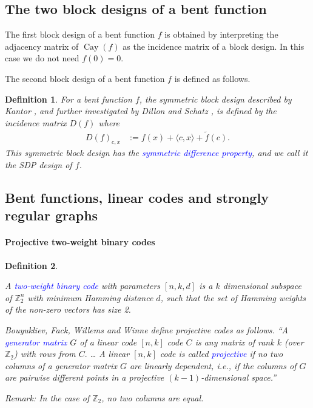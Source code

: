 \documentclass[12pt,a4paper]{article}
\newcommand{\mb}[1]{\mathbb{#1}}
\newcommand{\Z}{\mb{Z}}
\newcommand{\Emph}[1]{\emph{\textcolor{blue}{#1}}}
\newcommand{\Cay}[1]{\operatorname{Cay}\left(#1\right)}
\newcommand{\dual}[1]{\widetilde{#1}}
\newtheorem{Definition}{Definition}
\begin{document}
\subsection{The two block designs of a bent function}

The first block design of a bent function $f$ is obtained by interpreting
the adjacency matrix of $\Cay{f}$ as the incidence matrix of a block design.
In this case we do not need $f(0)=0$.

The second block design of a bent function $f$ is defined as follows.
\begin{Definition}
\label{def-SDP-design}
For a bent function $f$, the symmetric block design described by Kantor
\cite[Section 5]{Kan75symplectic},
and further investigated by Dillon and Schatz \cite{DilS87block}
\cite[Theorem 3.29]{Neu06bent},
is defined by the incidence matrix $D(f)$ where
\begin{align}
D(f)_{c,x} &:= f(x) + \langle c, x \rangle + \dual{f}(c).
\label{D-f-def}
\end{align}
This symmetric block design has the \Emph{symmetric difference property},
and we call it the \emph{SDP design} of $f$.
\end{Definition}
%
%
\subsection{Bent functions, linear codes and strongly regular graphs}
\paragraph*{Projective two-weight binary codes}

\begin{Definition}
\label{def-two-weight-codes}
\cite{BouFFWW2006} \cite{Ton96uniformly}

A \Emph{two-weight binary code} with parameters $[n,k,d]$ is a $k$ dimensional subspace of $\Z_2^n$
with
minimum Hamming distance $d$, such that the set of Hamming weights of the non-zero vectors has size
2.

Bouyukliev, Fack, Willems and Winne \cite[p. 60]{BouFFWW2006} define projective codes as follows.
``A \Emph{generator matrix} $G$ of a linear code $[n, k]$ code $C$ is any matrix
of rank $k$ (over $\Z_2$) with rows from $C.$ \ldots
A linear $[n, k]$ code is called \Emph{projective} if no two columns of a generator matrix
$G$ are linearly dependent, i.e., if the columns of $G$ are pairwise different points in a
projective $(k-1)$-dimensional space.''

Remark: In the case of $\Z_2$, no two columns are equal.
%
%
%
\end{Definition}
\end{document}
